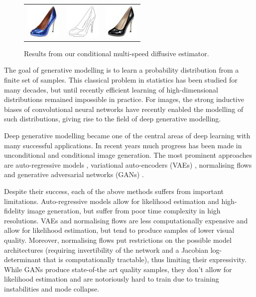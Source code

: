 \begin{figure}[h]
\begin{center}
\begin{tabular}{ccc}
        \includegraphics[width=.13\textwidth]{Chapter2/samples/teaser/189_x.png} &   
        \includegraphics[width=.13\textwidth]{Chapter2/samples/teaser/189_y.png} &
        \includegraphics[width=.13\textwidth]{Chapter2/samples/teaser/189_3.png}  \\
    \end{tabular}
    \end{center}
    \caption{Results from our conditional multi-speed diffusive estimator.}
    \label{ch2:fig:_teaser}
\end{figure}

The goal of generative modelling is to learn a  probability distribution from a finite set of samples. This classical problem in statistics has been studied for many decades, but until recently efficient learning of high-dimensional distributions remained impossible in practice. For images, the strong inductive biases of convolutional neural networks have recently enabled the modelling of such distributions, giving rise to the field of deep generative modelling.

Deep generative modelling became one of the central areas of deep learning with many successful applications.
In recent years much progress has been made in unconditional and conditional image generation.
The most prominent approaches are auto-regressive models \cite{bengio2005autoregressive}, variational auto-encoders (VAEs) \cite{kingma2014autoencoding},  normalising flows \cite{papamakarios2021normalizing} and generative adversarial networks (GANs) \cite{goodfellow2014generative}.

Despite their success, each of the above methods suffers from important limitations. Auto-regressive models allow for likelihood estimation and high-fidelity image generation, but suffer from poor time complexity in high resolutions. VAEs and normalising flows are less computationally expensive and allow for likelihood estimation, but tend to produce samples of lower visual quality. Moreover, normalising flows put restrictions on the possible model architectures (requiring invertibility of the network and a Jacobian log-determinant that is computationally tractable), thus limiting their expressivity. While GANs produce state-of-the art quality samples, they don't allow for likelihood estimation and are notoriously hard to train due to training instabilities and mode collapse. 

